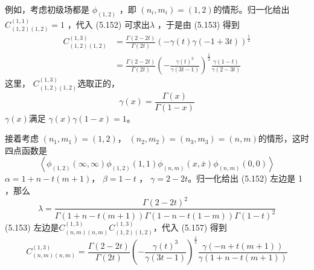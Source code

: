 例如，考虑初级场都是 $\phi_{(1,2)}$ ，即 $\left(n_{i}, m_{i}\right)=(1,2) $的情形。归一化给出$ C_{(1,2)(1,2)}^{(1,1)}=1$ ，代入 (5.152) 可求出$ \lambda$ ，于是由 (5.153) 得到
\begin{equation}
	\begin{aligned} C_{(1,2)(1,2)}^{(1,3)} &=\frac{\Gamma(2-2 t)}{\Gamma(2 t)}(-\gamma(t) \gamma(-1+3 t))^{\frac{1}{2}} \\ &=\frac{\Gamma(2-2 t)}{\Gamma(2 t)}\left(-\frac{\gamma(t)^{3}}{\gamma(3 t-1)}\right)^{\frac{1}{2}} \frac{\gamma(1-t)}{\gamma(2-3 t)} \end{aligned} 
\end{equation}
这里， $C_{(1,2)(1,2)}^{(1,3)} $选取正的，
\begin{equation}
	\gamma(x)=\frac{\Gamma(x)}{\Gamma(1-x)}
\end{equation}
$\gamma(x) $满足 $\gamma(x) \gamma(1-x)=1 $。

接着考虑 $\left(n_{1}, m_{1}\right)=(1,2) $， $\left(n_{2}, m_{2}\right)=\left(n_{3}, m_{3}\right)=(n, m) $的情形，这时四点函数是
\begin{equation}
	\left\langle\phi_{(1,2)}(\infty, \infty) \phi_{(1,2)}(1,1) \phi_{(n, m)}(x, \bar{x}) \phi_{(n, m)}(0,0)\right\rangle
\end{equation}
$\alpha=1+n-t(m+1)$， $\beta=1-t$ ， $\gamma=2-2 t $。归一化给出 (5.152) 左边是 1 ，那么
\begin{equation}
\lambda=\frac{\Gamma(2-2 t)^{2}}{\Gamma(1+n-t(m+1)) \Gamma(1-n-t(1-m)) \Gamma(1-t)^2}
\end{equation}
(5.153) 左边是$ C_{(n, m)(n, m)}^{(1,3)} C_{(1,2)(1,2)}^{(1,3)} $，代入 (5.157) 得到
\begin{equation}
	C_{(n, m)(n, m)}^{(1,3)}=\frac{\Gamma(2-2 t)}{\Gamma(2 t)}\left(-\frac{\gamma(t)^{3}}{\gamma(3 t-1)}\right)^{\frac{1}{2}} \frac{\gamma(-n+t(m+1))}{\gamma(1+n-t(m+1))}
\end{equation}

